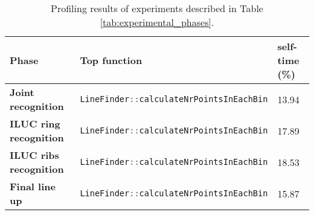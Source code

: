 \begin{table}[H]
    \centering
    \begin{tabular}{|p{4cm}|p{7cm}|p{2.5cm}|}
        \hline
        \textbf{Phase}                 & \textbf{Top function}                                          & \textbf{self-time (\%)} \\ \hline
        \textbf{Joint recognition}     & \lstinline[language=c]|LineFinder::calculateNrPointsInEachBin| & 13.94                   \\ \hline
        \textbf{ILUC ring recognition} & \lstinline[language=c]|LineFinder::calculateNrPointsInEachBin| & 17.89                   \\ \hline
        \textbf{ILUC ribs recognition} & \lstinline[language=c]|LineFinder::calculateNrPointsInEachBin| & 18.53                   \\ \hline
        \textbf{Final line up}         & \lstinline[language=c]|LineFinder::calculateNrPointsInEachBin| & 15.87                   \\ \hline
    \end{tabular}
    \caption{Profiling results  of experiments described in Table \ref{tab:experimental_phases}.}
    \label{tab:profiling_results}
\end{table}